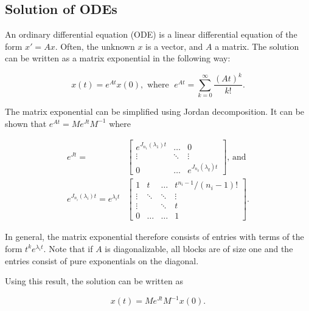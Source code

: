 \documentclass[../main.tex]{subfiles}
\begin{document}
\subsection{Solution of ODEs}
An ordinary differential equation (ODE) is a linear differential equation of the form $x'=Ax$. Often, the unknown $x$ is a vector, and $A$ a matrix. The solution can be written as a matrix exponential in the following way:

\begin{equation}
    x(t) = e^{At}x(0), \text{ where } \;e^{At} = \sum_{k=0}^{\infty}\frac{(At)^k}{k!}.
\end{equation}

The matrix exponential can be simplified using Jordan decomposition. It can be shown that  $e^{At} = Me^{Jt}M^{-1}$ where 

\begin{equation}
    \begin{aligned}
        e^{Jt} = &\begin{bmatrix}e^{J_{n_1}(\lambda_1)t} & \dots & 0 \\
                                                         \vdots & \ddots & \vdots \\
                                                         0 & \dots &  e^{J_{n_q}(\lambda_q)t}\end{bmatrix} \text{, and } \\
            e^{J_{n_i}(\lambda_i)t} = e^{\lambda_it} &\begin{bmatrix} 1 & t & \dots & t^{n_i-1}/(n_i-1)! \\
                                                                \vdots  & \ddots & \ddots & \vdots \\
                                                                \vdots & & \ddots& t \\
                                                            0 & \dots & \dots & 1\ \end{bmatrix}.
    \end{aligned}
\end{equation}

In general, the matrix exponential therefore consists of entries with terms of the form $t^ke^{\lambda_it}$. Note that if $A$ is diagonalizable, all blocks are of size one and the entries consist of pure exponentials on the diagonal. 

Using this result, the solution can be written as 

\begin{equation}\label{jordanode}
    x(t) = Me^{Jt}M^{-1}x(0).
\end{equation}
\end{document}
